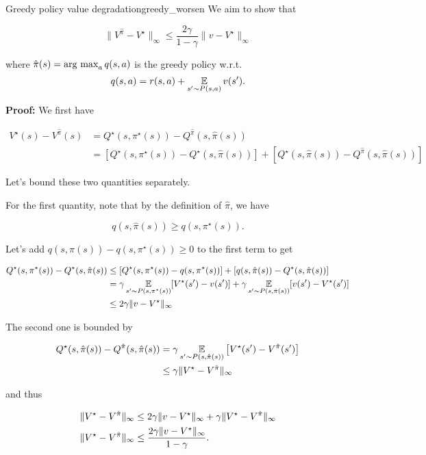 \documentclass[../main/main]{subfiles}
\begin{document}
\begin{theorem}{Greedy policy value degradation}{greedy_worsen}
    We aim to show that

    \[
        \|V^{\hat \pi} - V^\star \|_{\infty} \le \frac{2 \gamma}{1-\gamma} \|v - V^\star\|_{\infty}
    \]

    where $\hat \pi(s) = \operatorname*{\textrm{arg\ max}}_a q(s, a)$ is the greedy policy w.r.t. \[ q(s, a) = r(s, a) + \operatorname*{\mathbb{E}}_{s' \sim P(s, a)} v(s'). \]

    \textbf{Proof:} We first have

    \begin{align*}
        V^{\star}(s) - V^{\hat \pi}(s) &= Q^{\star}(s,\pi^\star(s)) - Q^{\hat \pi}(s, \hat \pi(s))\\
        &= [Q^{\star}(s,\pi^\star(s)) - Q^{\star}(s, \hat \pi(s))] + [Q^{\star}(s, \hat \pi(s)) - Q^{\hat \pi}(s, \hat \pi(s))]
    \end{align*}

    Let's bound these two quantities separately.

    For the first quantity, note that by the definition of $\hat \pi$, we have
    
    \[ q(s, \hat \pi(s)) \ge q(s,\pi^\star(s)). \]
    
    Let's add $q(s, \hat \pi(s)) - q(s,\pi^\star(s)) \ge 0$ to the first term to get

    \begin{align*}
        Q^{\star}(s,\pi^\star(s)) - Q^{\star}(s, \hat \pi(s)) &\le [Q^{\star}(s,\pi^\star(s))- q(s,\pi^\star(s))] + [q(s, \hat \pi(s)) - Q^{\star}(s, \hat \pi(s))] \\
        &= \gamma \operatorname*{\mathbb{E}}_{s' \sim P(s, \pi^{\star}(s))} [ V^{\star}(s') - v(s') ] + \gamma \operatorname*{\mathbb{E}}_{s' \sim P(s, \hat \pi(s))} [ v(s') - V^{\star}(s') ] \\
        &\le 2 \gamma \|v - V^{\star}\|_{\infty}
    \end{align*}

    The second one is bounded by

    \begin{align*}
        Q^{\star}(s, \hat \pi(s)) - Q^{\hat \pi}(s, \hat \pi(s))
        &=
        \gamma \operatorname*{\mathbb{E}}_{s'\sim P(s, \hat \pi(s))}\left[ V^\star(s') - V^{\hat \pi}(s') \right] \\
        & \leq 
        \gamma \|V^{\star} - V^{\hat \pi}\|_\infty
    \end{align*}

    and thus

    \begin{align*}
        \|V^\star - V^{\hat \pi}\|_\infty &\le 2 \gamma \|v - V^{\star}\|_{\infty} + \gamma \|V^{\star} - V^{\hat \pi}\|_\infty \\
        \|V^\star - V^{\hat \pi}\|_\infty &\le {2 \gamma \|v - V^{\star}\|_{\infty} \over 1-\gamma}.
    \end{align*}
\end{theorem}
\end{document}
